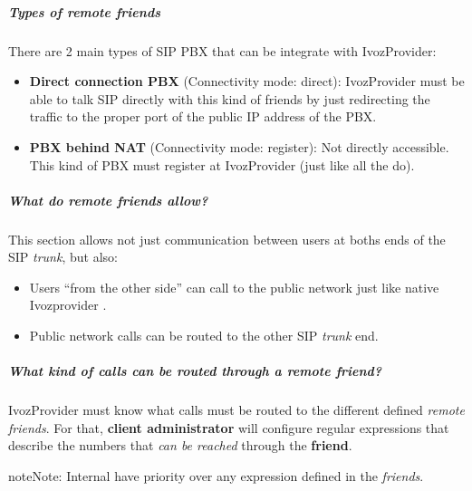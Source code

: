 \documentclass[letterpaper,10pt,english]{sphinxmanual}
\begin{document}
\subparagraph{Types of remote friends}
\label{administration_portal/client/vpbx/routing_endpoints/friends/remote_friends:types-of-remote-friends}
There are 2 main types of SIP PBX that can be integrate with IvozProvider:
\begin{itemize}
\item {} 
\textbf{Direct connection PBX} (Connectivity mode: direct): IvozProvider must be able to talk SIP directly with
this kind of friends by just redirecting the traffic to the proper port of
the public IP address of the PBX.

\item {} 
\textbf{PBX behind NAT} (Connectivity mode: register): Not directly accessible. This kind of PBX must register at
IvozProvider (just like all the {\hyperref[administration_portal/client/vpbx/terminals:terminals]{}} do).

\end{itemize}


\subparagraph{What do remote friends allow?}
\label{administration_portal/client/vpbx/routing_endpoints/friends/remote_friends:what-do-remote-friends-allow}
This section allows not just communication between users at boths ends of the
SIP \emph{trunk}, but also:
\begin{itemize}
\item {} 
Users ``from the other side'' can call to the public network just like native
Ivozprovider {\hyperref[administration_portal/client/vpbx/users:users]{}}.

\item {} 
Public network calls can be routed to the other SIP \emph{trunk} end.

\end{itemize}


\subparagraph{What kind of calls can be routed through a \emph{remote friend}?}
\label{administration_portal/client/vpbx/routing_endpoints/friends/remote_friends:what-kind-of-calls-can-be-routed-through-a-remote-friend}
IvozProvider must know what calls must be routed to the different defined \emph{remote friends}.
For that, \textbf{client administrator} will configure regular expressions that
describe the numbers that \emph{can be reached} through the \textbf{friend}.

\begin{notice}{note}{Note:}
Internal {\hyperref[administration_portal/client/vpbx/extensions:extensions]{}} have priority over any expression
defined in the \emph{friends}.
\end{notice}
\end{document}
